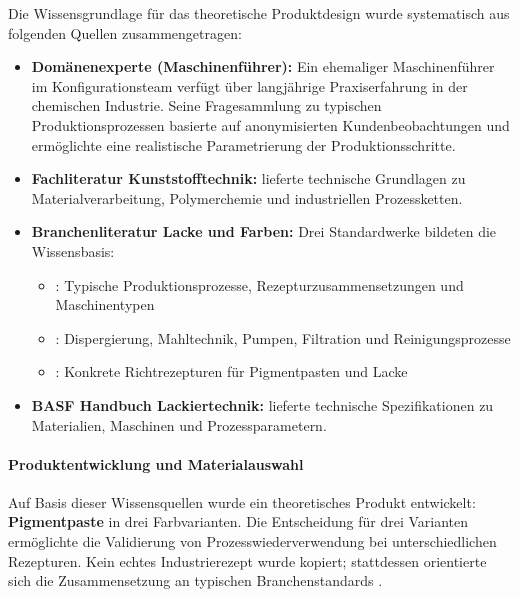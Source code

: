 Die Wissensgrundlage für das theoretische Produktdesign wurde systematisch aus folgenden Quellen zusammengetragen:

\begin{itemize}
    \item \textbf{Domänenexperte (Maschinenführer):} Ein ehemaliger Maschinenführer im Konfigurationsteam verfügt über langjährige Praxiserfahrung in der chemischen Industrie. Seine Fragesammlung zu typischen Produktionsprozessen basierte auf anonymisierten Kundenbeobachtungen und ermöglichte eine realistische Parametrierung der Produktionsschritte.

    \item \textbf{Fachliteratur Kunststofftechnik:} \cite{schwarz:kunststoffkunde1987} lieferte technische Grundlagen zu Materialverarbeitung, Polymerchemie und industriellen Prozessketten.

    \item \textbf{Branchenliteratur Lacke und Farben:} Drei Standardwerke bildeten die Wissensbasis:
    \begin{itemize}
        \item \cite{vci:lacke_farben2018}: Typische Produktionsprozesse, Rezepturzusammensetzungen und Maschinentypen
        \item \cite{brock:lacktechnologie2020}: Dispergierung, Mahltechnik, Pumpen, Filtration und Reinigungsprozesse
        \item \cite{mueller:lackformulierung2017}: Konkrete Richtrezepturen für Pigmentpasten und Lacke
    \end{itemize}

    \item \textbf{BASF Handbuch Lackiertechnik:} \cite{basf:lackiertechnik2019} lieferte technische Spezifikationen zu Materialien, Maschinen und Prozessparametern.
\end{itemize}

\paragraph{Produktentwicklung und Materialauswahl}

Auf Basis dieser Wissensquellen wurde ein theoretisches Produkt entwickelt: \textbf{Pigmentpaste} in drei Farbvarianten. Die Entscheidung für drei Varianten ermöglichte die Validierung von Prozesswiederverwendung bei unterschiedlichen Rezepturen. Kein echtes Industrierezept wurde kopiert; stattdessen orientierte sich die Zusammensetzung an typischen Branchenstandards \citep{vci:lacke_farben2018, mueller:lackformulierung2017}.

